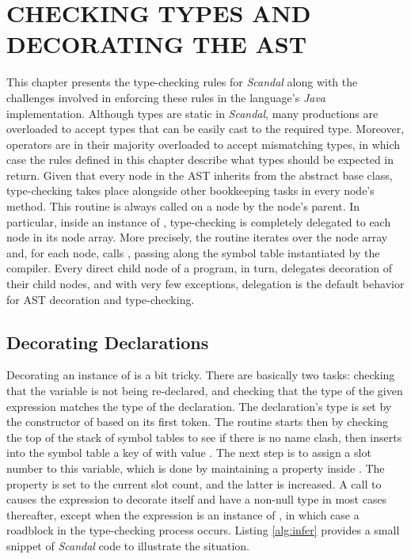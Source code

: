 \chapter{CHECKING TYPES AND DECORATING THE AST}

This chapter presents the type-checking rules for \emph{Scandal} along with the challenges involved in enforcing these rules in the language's \emph{Java} implementation. Although types are static in \emph{Scandal}, many productions are overloaded to accept types that can be easily cast to the required type. Moreover, operators are in their majority overloaded to accept mismatching types, in which case the rules defined in this chapter describe what types should be expected in return. Given that every node in the AST inherits from the  abstract base class, type-checking takes place alongside other bookkeeping tasks in every node's  method. This routine is always called on a node by the node's parent. In particular, inside an instance of , type-checking is completely delegated to each node in its node array. More precisely, the  routine iterates over the node array and, for each node, calls , passing along the symbol table instantiated by the compiler. Every direct child node of a program, in turn, delegates decoration of their child nodes, and with very few exceptions, delegation is the default behavior for AST decoration and type-checking.

\section{Decorating Declarations}

Decorating an instance of  is a bit tricky. There are basically two tasks: checking that the variable is not being re-declared, and checking that the type of the given expression matches the type of the declaration. The declaration's type is set by the constructor of  based on its first token. The  routine starts then by checking the top of the stack of symbol tables to see if there is no name clash, then inserts into the symbol table a key of  with value . The next step is to assign a slot number to this variable, which is done by maintaining a property  inside . The  property is set to the current slot count, and the latter is increased. A call to  causes the expression to decorate itself and have a non-null type in most cases thereafter, except when the expression is an instance of , in which case a roadblock in the type-checking process occurs. Listing \ref{alg:infer} provides a small snippet of \emph{Scandal} code to illustrate the situation.

